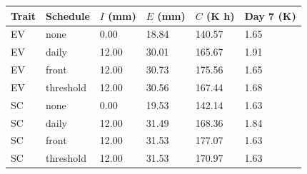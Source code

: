 \begin{tabular}{llllll}
\toprule
Trait & Schedule & $I$ (mm) & $E$ (mm) & $C$ (K h) & Day 7 (K) \\
\midrule
EV & none & 0.00 & 18.84 & 140.57 & 1.65 \\
EV & daily & 12.00 & 30.01 & 165.67 & 1.91 \\
EV & front & 12.00 & 30.73 & 175.56 & 1.65 \\
EV & threshold & 12.00 & 30.56 & 167.44 & 1.68 \\
SC & none & 0.00 & 19.53 & 142.14 & 1.63 \\
SC & daily & 12.00 & 31.49 & 168.36 & 1.84 \\
SC & front & 12.00 & 31.53 & 177.07 & 1.63 \\
SC & threshold & 12.00 & 31.53 & 170.97 & 1.63 \\
\bottomrule
\end{tabular}
